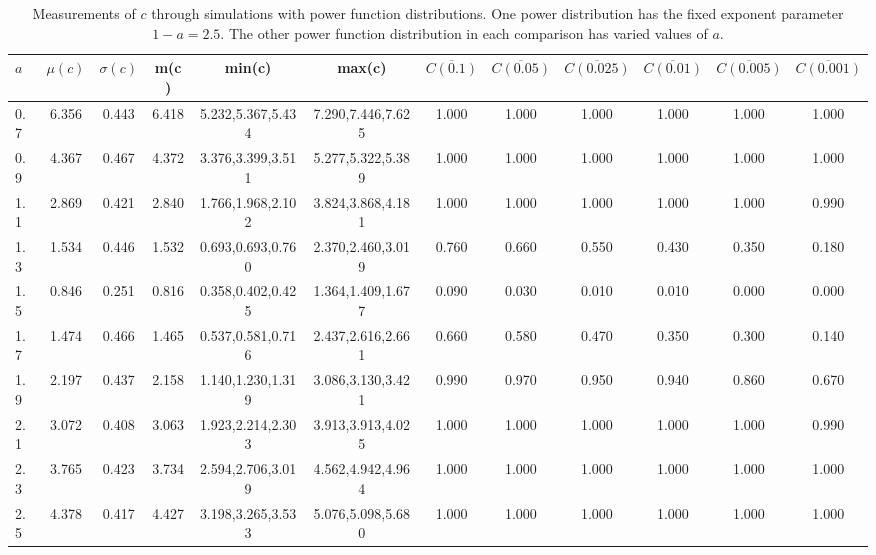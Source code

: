 \begin{table*}[h!]
\begin{center}
\begin{tabular}{| l | c | c | c | c | c | c | c | c | c | c | c |}\hline
$a$ & $\mu(c)$ & $\sigma(c)$ & m(c) & min(c) & max(c) & $\overline{C(0.1)}$ & $\overline{C(0.05)}$ & $\overline{C(0.025)}$ & $\overline{C(0.01)}$ & $\overline{C(0.005)}$ & $\overline{C(0.001)}$ \\\hline
0.7 & 6.356 & 0.443 & 6.418 & 5.232,5.367,5.434 & 7.290,7.446,7.625  & 1.000  & 1.000  & 1.000  & 1.000  & 1.000  & 1.000 \\\hline
0.9 & 4.367 & 0.467 & 4.372 & 3.376,3.399,3.511 & 5.277,5.322,5.389  & 1.000  & 1.000  & 1.000  & 1.000  & 1.000  & 1.000 \\\hline
1.1 & 2.869 & 0.421 & 2.840 & 1.766,1.968,2.102 & 3.824,3.868,4.181  & 1.000  & 1.000  & 1.000  & 1.000  & 1.000  & 0.990 \\\hline
1.3 & 1.534 & 0.446 & 1.532 & 0.693,0.693,0.760 & 2.370,2.460,3.019  & 0.760  & 0.660  & 0.550  & 0.430  & 0.350  & 0.180 \\\hline
1.5 & 0.846 & 0.251 & 0.816 & 0.358,0.402,0.425 & 1.364,1.409,1.677  & 0.090  & 0.030  & 0.010  & 0.010  & 0.000  & 0.000 \\\hline
1.7 & 1.474 & 0.466 & 1.465 & 0.537,0.581,0.716 & 2.437,2.616,2.661  & 0.660  & 0.580  & 0.470  & 0.350  & 0.300  & 0.140 \\\hline
1.9 & 2.197 & 0.437 & 2.158 & 1.140,1.230,1.319 & 3.086,3.130,3.421  & 0.990  & 0.970  & 0.950  & 0.940  & 0.860  & 0.670 \\\hline
2.1 & 3.072 & 0.408 & 3.063 & 1.923,2.214,2.303 & 3.913,3.913,4.025  & 1.000  & 1.000  & 1.000  & 1.000  & 1.000  & 0.990 \\\hline
2.3 & 3.765 & 0.423 & 3.734 & 2.594,2.706,3.019 & 4.562,4.942,4.964  & 1.000  & 1.000  & 1.000  & 1.000  & 1.000  & 1.000 \\\hline
2.5 & 4.378 & 0.417 & 4.427 & 3.198,3.265,3.533 & 5.076,5.098,5.680  & 1.000  & 1.000  & 1.000  & 1.000  & 1.000  & 1.000 \\\hline
\end{tabular}
\caption{Measurements of $c$ through simulations
with power function distributions.
One power distribution has the fixed exponent parameter $1-a=2.5$.
The other power function distribution in each comparison
has varied values of $a$.}
\end{center}
\end{table*}